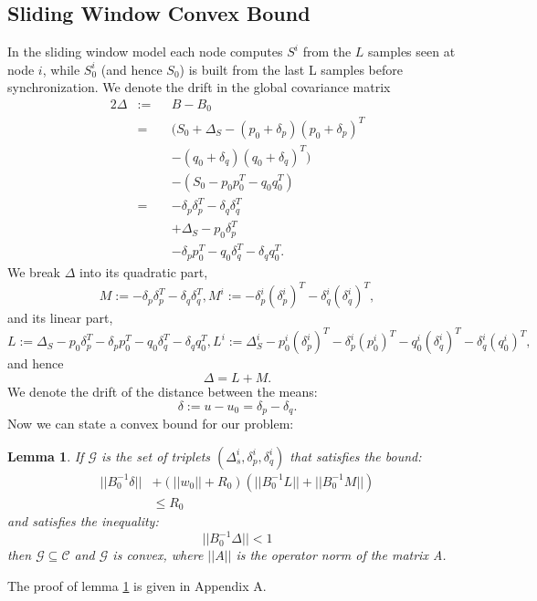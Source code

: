 \documentclass{sig-alternate-05-2015}
\newtheorem{lemma}{Lemma}
\begin{document}
\subsection{Sliding Window Convex Bound}
In the sliding window model each node computes $S^i$ from the $L$ samples seen
at node $i$, while $S_0^i$ (and hence $S_0$) is built from the last L samples before
synchronization. 
We denote the drift in the global covariance matrix
\begin{alignat*}{2}
\Delta & := && B-B_0 \\
& = && (S_0+\Delta_S - (p_0+\delta_p)(p_0+\delta_p)^T \\
& && - (q_0+\delta_q)(q_0+\delta_q)^T) \\
& && - (S_0 - p_0p_0^T - q_0q_0^T) \\
& = && - \delta_p\delta_p^T - \delta_q\delta_q^T \\
& && + \Delta_S - p_0\delta_p^T \\
& && - \delta_pp_0^T - q_0\delta_q^T - \delta_qq_0^T.
\end{alignat*}
We break $\Delta$ into its quadratic part,
\begin{equation*}
M:= - \delta_p\delta_p^T - \delta_q\delta_q^T,
M^i:= - \delta_p^i(\delta_p^i)^T - \delta_q^i(\delta_q^i)^T, 
\end{equation*}
and its linear part,
\begin{equation*}
L:= \Delta_S - p_0\delta_p^T - \delta_pp_0^T - q_0\delta_q^T - \delta_qq_0^T, 
L^i := \Delta_S^i - p_0^i(\delta_p^i)^T - \delta_p^i(p_0^i)^T -
q_0^i(\delta_q^i)^T - \delta_q^i(q_0^i)^T,
\end{equation*}
and hence 
\begin{equation*}
\Delta= L+ M.
\end{equation*}
We denote the drift of the distance between the means:
\begin{equation*}
\delta:= u-u_0 = \delta_p - \delta_q.
\end{equation*}
Now we can state a convex bound for our problem:
\begin{lemma} \label{convexBound}
If $\mathcal{G}$ is the set of triplets $(\Delta_s^i, \delta_p^i, \delta_q^i)$
 that satisfies the bound:
 \begin{equation} \label{eq:convexBound}
\begin{split}
||B_0^{-1}\delta|| &+ (||w_0||+R_0)(||B_0^{-1}L||+||B_0^{-1}M||) \\ & \leq  R_0
\end{split}
\end{equation}
and satisfies the inequality:
 \begin{equation*} 
||B_0^{-1}\Delta|| < 1
\end{equation*}
 then $\mathcal{G}
 \subseteq \mathcal{C}$ and $\mathcal{G}$ is convex, where $||A||$ is the
 operator norm of the matrix A.
\end{lemma}
The proof of lemma \ref{convexBound} is given in Appendix A.
\end{document}
